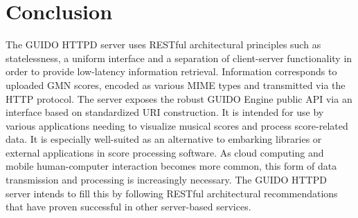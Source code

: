 \documentclass[11pt,a4paper]{article}
\begin{document}
\section{Conclusion}
The GUIDO HTTPD server uses RESTful architectural principles such as statelessness, a uniform interface and a separation of client-server functionality in order to provide low-latency information retrieval.  Information corresponds to uploaded GMN scores, encoded as various MIME types and transmitted via the HTTP protocol.  The server exposes the robust GUIDO Engine public API via an interface based on standardized URI construction.  It is intended for use by various applications needing to visualize musical scores and process score-related data.  It is especially well-suited as an alternative to embarking libraries or external applications in score processing software.  As cloud computing and mobile human-computer interaction becomes more common, this form of data transmission and processing is increasingly necessary.  The GUIDO HTTPD server intends to fill this by following RESTful architectural recommendations that have proven successful in other server-based services.\par

\balance

%

\end{document}
